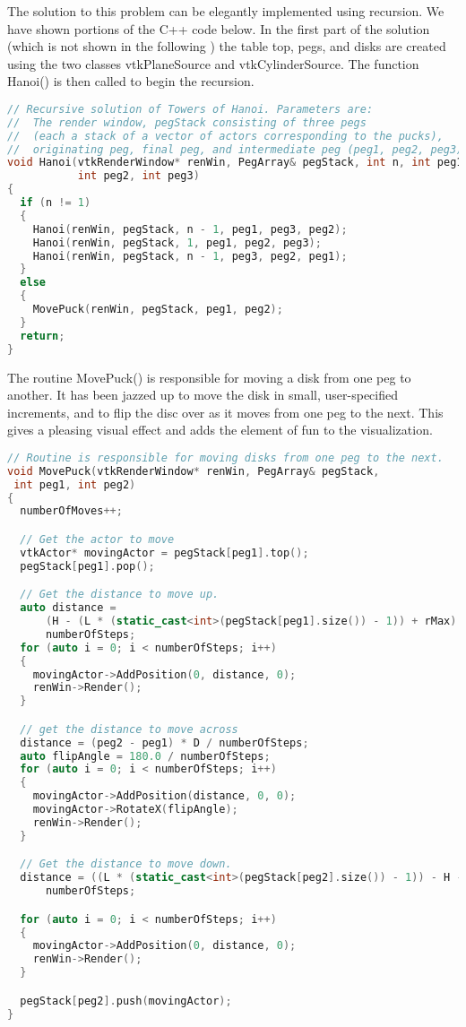 The solution to this problem can be elegantly implemented using recursion. We have shown portions of the C++ code below.
In the first part of the solution (which is not shown in the following ) the table top, pegs, and disks are created using the two classes vtkPlaneSource and vtkCylinderSource. The function Hanoi() is then called to begin the recursion.

\begin{lstlisting}[language=C++, caption={Recursive solution for the Towers of Hanoi.}]
// Recursive solution of Towers of Hanoi. Parameters are:
//  The render window, pegStack consisting of three pegs
//  (each a stack of a vector of actors corresponding to the pucks),
//  originating peg, final peg, and intermediate peg (peg1, peg2, peg3).
void Hanoi(vtkRenderWindow* renWin, PegArray& pegStack, int n, int peg1,
           int peg2, int peg3)
{
  if (n != 1)
  {
    Hanoi(renWin, pegStack, n - 1, peg1, peg3, peg2);
    Hanoi(renWin, pegStack, 1, peg1, peg2, peg3);
    Hanoi(renWin, pegStack, n - 1, peg3, peg2, peg1);
  }
  else
  {
    MovePuck(renWin, pegStack, peg1, peg2);
  }
  return;
}
\end{lstlisting}

\noindent The routine MovePuck() is responsible for moving a disk from one peg to another. It has been jazzed up to move the disk in small, user-specified increments, and to flip the disc over as it moves from one peg to the next. This gives a pleasing visual effect and adds the element of fun to the visualization.

\begin{lstlisting}[language=C++, caption={Moving the puck.}]
// Routine is responsible for moving disks from one peg to the next.
void MovePuck(vtkRenderWindow* renWin, PegArray& pegStack,
 int peg1, int peg2)
{
  numberOfMoves++;

  // Get the actor to move
  vtkActor* movingActor = pegStack[peg1].top();
  pegStack[peg1].pop();

  // Get the distance to move up.
  auto distance =
      (H - (L * (static_cast<int>(pegStack[peg1].size()) - 1)) + rMax) /
      numberOfSteps;
  for (auto i = 0; i < numberOfSteps; i++)
  {
    movingActor->AddPosition(0, distance, 0);
    renWin->Render();
  }

  // get the distance to move across
  distance = (peg2 - peg1) * D / numberOfSteps;
  auto flipAngle = 180.0 / numberOfSteps;
  for (auto i = 0; i < numberOfSteps; i++)
  {
    movingActor->AddPosition(distance, 0, 0);
    movingActor->RotateX(flipAngle);
    renWin->Render();
  }

  // Get the distance to move down.
  distance = ((L * (static_cast<int>(pegStack[peg2].size()) - 1)) - H - rMax) /
      numberOfSteps;

  for (auto i = 0; i < numberOfSteps; i++)
  {
    movingActor->AddPosition(0, distance, 0);
    renWin->Render();
  }

  pegStack[peg2].push(movingActor);
}
\end{lstlisting}

